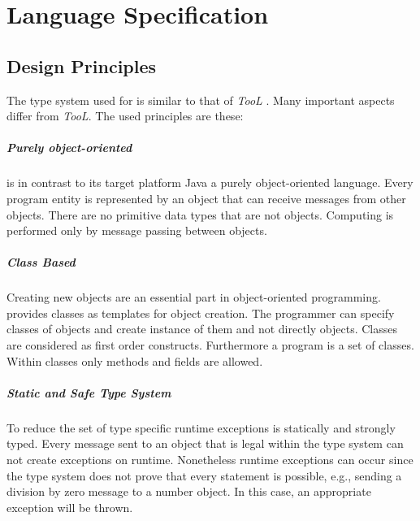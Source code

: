 \chapter{Language Specification}
\section{Design Principles}
The type system used for \ooplss is similar to that of \emph{TooL}
\cite{gawecki_tool:_1995}. Many important aspects differ from
\emph{TooL}. The used principles are these:

\paragraph{Purely object-oriented}
\ooplss is in contrast to its target platform Java a purely
object-oriented language. Every program entity is represented by an
object that can receive messages from other objects. There are no
primitive data types that are not objects. Computing is performed only
by message passing between objects. 

\paragraph{Class Based}
Creating new objects are an essential part in object-oriented
programming. \ooplss provides classes as templates for object
creation. The programmer can specify classes of objects and create
instance of them and not directly objects. Classes are considered as
first order constructs. Furthermore a program is a set of classes. Within
classes only methods and fields are allowed.

\paragraph{Static and Safe Type System}
To reduce the set of type specific runtime exceptions \ooplss is statically
and strongly typed. Every message sent to an object that is legal within
the type system can not create exceptions on runtime. Nonetheless runtime
exceptions can occur since the type system does not prove that every
statement is possible, e.g., sending a division by zero message to a
number object.  In this case, an appropriate exception will be thrown.

